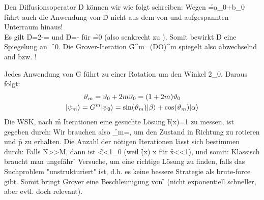Den Diffusionsoperator \f{D} können wir wie folgt schreiben:
Wegen \f{=a_0\cket{\alpha}+b_0\cket{\beta}} führt auch die Anwendung von \f{D} nicht aus dem von \ket{\alpha} und \ket{\beta} aufgespannten Unterraum hinaus!\\
Es gilt \f{D=2-=} und \f{D=-} für \f{=0} (also  senkrecht zu ). Somit bewirkt \f{D} eine Spiegelung an \f{\psi_0}. Die Grover-Iteration \f{G^m=(DO)^m} spiegelt also abwechselnd and \ket{\alpha} bzw. !


Jedes Anwendung von \f{G} führt zu einer Rotation um den Winkel \f{2\vartheta_0}. Daraus folgt:
\begin{gather*}
    \vartheta_m = \vartheta_0 + 2m\vartheta_0 = (1+2m)\vartheta_0\\
    |\psi_m\rangle = G^m|\psi_0\rangle=\sin(\vartheta_m)|\beta\rangle+\cos(\vartheta_m)|\alpha\rangle
\end{gather*}
Die WSK, nach \f{m} Iterationen eine gesuchte Lösung \f{f(x)=1} zu messen, ist gegeben durch:
Wir brauchen also \f{\vartheta_m=}, um den Zustand in Richtung \ket{\beta} zu rotieren und \f{p} zu erhalten. Die Anzahl der nötigen Iterationen lässt sich bestimmen durch:
Falls \f{N>>M}, dann ist \f{<<1\Rightarrow\vartheta_0\approx{}} (weil \f{\sin(x) \approx x} für \f{x<<1}), und somit:
Klassisch braucht man ungefähr \f{} Versuche, um eine richtige Lösung zu finden, falls das Suchproblem "unstrukturiert" ist, d.h. es keine bessere Strategie als brute-force gibt. Somit bringt Grover eine Beschleunigung von \f{\rightarrow{}} (nicht exponentiell schneller, aber evtl. doch relevant).


